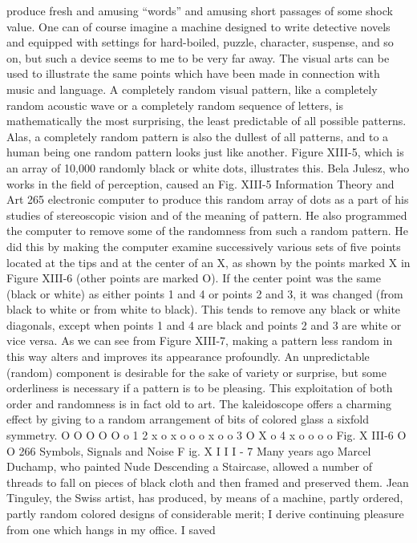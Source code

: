 {{{{{{{{{{{{produce fresh and amusing “words” and amusing short passages
of some shock value. One can of course imagine a machine
designed to write detective novels and equipped with settings for
hard-boiled, puzzle, character, suspense, and so on, but such a
device seems to me to be very far away.
The visual arts can be used to illustrate the same points which
have been made in connection with music and language. A completely
random visual pattern, like a completely random acoustic
wave or a completely random sequence of letters, is mathematically
the most surprising, the least predictable of all possible patterns.
Alas, a completely random pattern is also the dullest of all patterns,
and to a human being one random pattern looks just like another.
Figure XIII-5, which is an array of 10,000 randomly black or white
dots, illustrates this.
Bela Julesz, who works in the field of perception, caused an
Fig. XIII-5
Information Theory and Art
265
electronic computer to produce this random array of dots as a part
of his studies of stereoscopic vision and of the meaning of pattern.
He also programmed the computer to remove some of the randomness
from such a random pattern. He did this by making the
computer examine successively various sets of five points located
at the tips and at the center of an X, as shown by the points marked
X in Figure XIII-6 (other points are marked O). If the center point
was the same (black or white) as either points 1 and 4 or points
2 and 3, it was changed (from black to white or from white to
black). This tends to remove any black or white diagonals, except
when points 1 and 4 are black and points 2 and 3 are white or
vice versa.
As we can see from Figure XIII-7, making a pattern less random
in this way alters and improves its appearance profoundly. An
unpredictable (random) component is desirable for the sake of
variety or surprise, but some orderliness is necessary if a pattern
is to be pleasing.
This exploitation of both order and randomness is in fact old
to art. The kaleidoscope offers a charming effect by giving to a
random arrangement of bits of colored glass a sixfold symmetry.
O O O O O
o
1 2
x o x o
o o x o o
3
O X o
4
x o
o o o
Fig. X III-6
O O
266 Symbols, Signals and Noise
F ig. X I I I - 7
Many years ago Marcel Duchamp, who painted Nude Descending
a Staircase, allowed a number of threads to fall on pieces of black
cloth and then framed and preserved them. Jean Tinguley, the
Swiss artist, has produced, by means of a machine, partly ordered,
partly random colored designs of considerable merit; I derive
continuing pleasure from one which hangs in my office. I saved
}}}}}}}}}}}}
